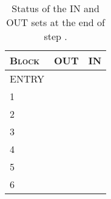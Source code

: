 \begin{table}[H]
\centering
\begin{tabular}{lcc}
	\toprule
	\textsc{Block}	& \textsc{OUT}	& \textsc{IN} \\
	\midrule
	ENTRY	& \OUTBe	& \INBe		\\
	1		& \OUTBone	& \INBone	\\
	2		& \OUTBtwo	& \INBtwo	\\
	3		& \OUTBthree& \INBthree	\\
	4		& \OUTBfour	& \INBfour	\\
	5		& \OUTBfive	& \INBfive	\\
	6		& \OUTBsix	& \INBsix	\\
	\bottomrule
\end{tabular}
\caption{Status of the IN and OUT sets at the end of step .}
\label{tab:\arabic{section}-\alph{subsection}-\arabic{subsubsection}} %
\end{table}
